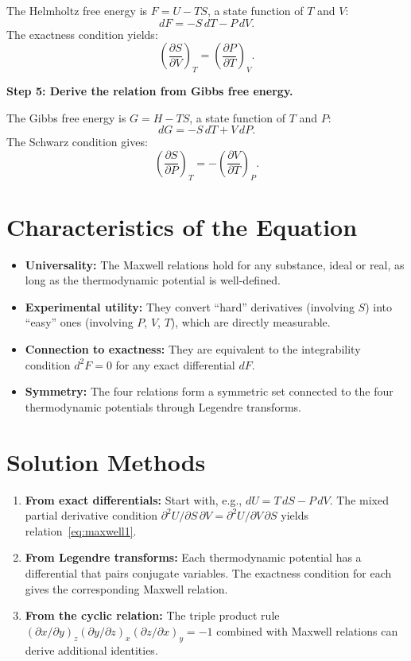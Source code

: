 The Helmholtz free energy is $F = U - TS$, a state function of $T$ and $V$:
\begin{equation}
dF = -S\,dT - P\,dV.
\end{equation}
The exactness condition yields:
\begin{equation}
\left(\frac{\partial S}{\partial V}\right)_{T} = \left(\frac{\partial P}{\partial T}\right)_{V}.
\end{equation}

\textbf{Step 5: Derive the relation from Gibbs free energy.}

The Gibbs free energy is $G = H - TS$, a state function of $T$ and $P$:
\begin{equation}
dG = -S\,dT + V\,dP.
\end{equation}
The Schwarz condition gives:
\begin{equation}
\left(\frac{\partial S}{\partial P}\right)_{T} = -\left(\frac{\partial V}{\partial T}\right)_{P}.
\end{equation}

\section*{Characteristics of the Equation}

\begin{itemize}
  \item \textbf{Universality:} The Maxwell relations hold for any substance, ideal or real, as long as the thermodynamic potential is well-defined.
  \item \textbf{Experimental utility:} They convert ``hard'' derivatives (involving $S$) into ``easy'' ones (involving $P$, $V$, $T$), which are directly measurable.
  \item \textbf{Connection to exactness:} They are equivalent to the integrability condition $d^{2}F = 0$ for any exact differential $dF$.
  \item \textbf{Symmetry:} The four relations form a symmetric set connected to the four thermodynamic potentials through Legendre transforms.
\end{itemize}
\section*{Solution Methods}

\begin{enumerate}
  \item \textbf{From exact differentials:} Start with, e.g., $dU = T\,dS - P\,dV$. The mixed partial derivative condition $\partial^{2}U/\partial S\,\partial V = \partial^{2}U/\partial V\,\partial S$ yields relation~\eqref{eq:maxwell1}.
  \item \textbf{From Legendre transforms:} Each thermodynamic potential has a differential that pairs conjugate variables. The exactness condition for each gives the corresponding Maxwell relation.
  \item \textbf{From the cyclic relation:} The triple product rule $(\partial x/\partial y)_{z}(\partial y/\partial z)_{x}(\partial z/\partial x)_{y} = -1$ combined with Maxwell relations can derive additional identities.
\end{enumerate}
